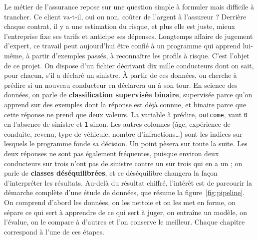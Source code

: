\documentclass[12pt,oneside,noprintercorrection]{iut}
\begin{document}
\MakeThesisTitlePage
\tableofcontents
\mainmatter


Le métier de l'assurance repose sur une question simple à formuler mais difficile à
trancher. Ce client va-t-il, oui ou non, coûter de l'argent à l'assureur ? Derrière
chaque contrat, il y a une estimation du risque, et plus elle est juste, mieux
l'entreprise fixe ses tarifs et anticipe ses dépenses. Longtemps affaire de jugement
d'expert, ce travail peut aujourd'hui être confié à un programme qui apprend lui-même,
à partir d'exemples passés, à reconnaître les profils à risque.
\newline
\newline
C'est l'objet de ce projet. On dispose d'un fichier décrivant dix mille conducteurs dont
on sait, pour chacun, s'il a déclaré un sinistre. À partir de ces données, on cherche à
prédire si un nouveau conducteur en déclarera un à son tour. En science des données, on
parle de \textbf{classification supervisée binaire}, supervisée parce qu'on apprend sur
des exemples dont la réponse est déjà connue, et binaire parce que cette réponse ne prend
que deux valeurs.
\newline
\newline
La variable à prédire, \texttt{outcome}, vaut \texttt{0} en l'absence de sinistre et
\texttt{1} sinon. Les autres colonnes (âge, expérience de conduite, revenu, type de
véhicule, nombre d'infractions…) sont les indices sur lesquels le programme fonde sa
décision. Un point pèsera sur toute la suite. Les deux réponses ne sont pas également
fréquentes, puisque environ deux conducteurs sur trois n'ont pas de sinistre contre un
sur trois qui en a un ; on parle de \textbf{classes déséquilibrées}, et ce déséquilibre
changera la façon d'interpréter les résultats.
\newline
\newline
Au-delà du résultat chiffré, l'intérêt est de parcourir la démarche complète d'une étude
de données, que résume la figure~\ref{fig:pipeline}. On comprend d'abord les données, on
les nettoie et on les met en forme, on sépare ce qui sert à apprendre de ce qui sert à
juger, on entraîne un modèle, on l'évalue, on le compare à d'autres et l'on conserve le
meilleur. Chaque chapitre correspond à l'une de ces étapes.
\end{document}
